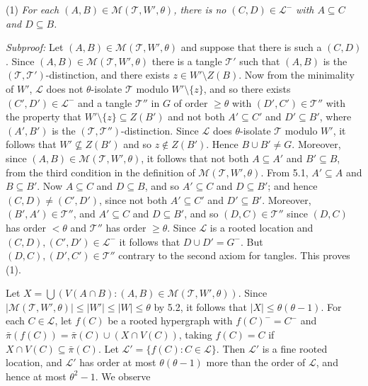 \hspace*{12pt}(1) \textit{For each $(A, B) \in \mathcal{M}(\mathcal{T}, W', \theta)$, there is no $(C, D) \in \mathcal{L}^-$ with $A \subseteq C$ and $D \subseteq B$.}

\textit{Subproof:} Let $(A, B) \in \mathcal{M}(\mathcal{T}, W', \theta)$ and suppose that there is such a $(C, D)$. Since $(A, B) \in \mathcal{M}(\mathcal{T}, W', \theta)$ there is a tangle $\mathcal{T}'$ such that $(A, B)$ is the $(\mathcal{T}, \mathcal{T}')$-distinction, and there exists $z \in W' \setminus Z(B)$. Now from the minimality of $W'$, $\mathcal{L}$ does not $\theta$-isolate $\mathcal{T}$ modulo $W' \setminus \{z\}$, and so there exists $(C', D') \in \mathcal{L}^-$ and a tangle $\mathcal{T}''$ in $G$ of order $\ge \theta$ with $(D', C') \in \mathcal{T}''$ with the property that $W' \setminus \{z\} \subseteq Z(B')$ and not both $A' \subseteq C'$ and $D' \subseteq B'$, where $(A', B')$ is the $(\mathcal{T}, \mathcal{T}'')$-distinction. Since $\mathcal{L}$ does $\theta$-isolate $\mathcal{T}$ modulo $W'$, it follows that $W' \nsubseteq Z(B')$ and so $z \notin Z(B')$. Hence $B \cup B' \ne G$. Moreover, since $(A, B) \in \mathcal{M}(\mathcal{T}, W', \theta)$, it follows that not both $A \subseteq A'$ and $B' \subseteq B$, from the third condition in the definition of $\mathcal{M}(\mathcal{T}, W', \theta)$. From 5.1, $A' \subseteq A$ and $B \subseteq B'$. Now $A \subseteq C$ and $D \subseteq B$, and so $A' \subseteq C$ and $D \subseteq B'$; and hence $(C, D) \ne (C', D')$, since not both $A' \subseteq C'$ and $D' \subseteq B'$. Moreover, $(B', A') \in \mathcal{T}''$, and $A' \subseteq C$ and $D \subseteq B'$, and so $(D, C) \in \mathcal{T}''$ since $(D, C)$ has order $< \theta$ and $\mathcal{T}''$ has order $\ge \theta$. Since $\mathcal{L}$ is a rooted location and $(C, D), (C', D') \in \mathcal{L}^-$ it follows that $D \cup D' = G^-$. But $(D, C), (D', C') \in \mathcal{T}''$ contrary to the second axiom for tangles. This proves (1).

Let $X = \bigcup(V(A \cap B) : (A, B) \in \mathcal{M}(\mathcal{T}, W', \theta))$. Since $|\mathcal{M}(\mathcal{T}, W', \theta)| \le |W'| \le |W| \le \theta$ by 5.2, it follows that $|X| \le \theta(\theta - 1)$. For each $C \in \mathcal{L}$, let $f(C)$ be a rooted hypergraph with $f(C)^- = C^-$ and $\bar{\pi}(f(C)) = \bar{\pi}(C) \cup (X \cap V(C))$, taking $f(C) = C$ if $X \cap V(C) \subseteq \bar{\pi}(C)$. Let $\mathcal{L}' = \{f(C) : C \in \mathcal{L}\}$. Then $\mathcal{L}'$ is a fine rooted location, and $\mathcal{L}'$ has order at most $\theta(\theta - 1)$ more than the order of $\mathcal{L}$, and hence at most $\theta^2 - 1$. We observe


